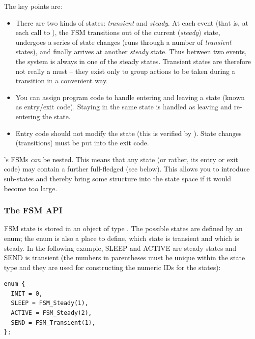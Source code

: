 The key points are:
\begin{itemize}
\item{There are two kinds of states:
    \textit{transient} and
    \textit{steady}. At each event (that is, at
    each call to ), the FSM transitions out of
    the current (\textit{steady}) state, undergoes a series of state
    changes (runs through a number of \textit{transient} states), and
    finally arrives at another \textit{steady} state. Thus between two
    events, the system is always in one of the steady states.
    Transient states are therefore not really a must -- they exist
    only to group actions to be taken during a transition in a
    convenient way.}
\item{You can assign program code to handle entering and leaving a state
    (known as entry/exit code).
    Staying in the same state is handled as leaving and re-entering
    the state.}
\item{Entry code should not modify the state (this is verified by
    {\opp}).  State changes (transitions) must be put into the exit
    code.}
\end{itemize}

{\opp}'s FSMs \textit{can} be nested. This means
that any state (or rather, its entry or exit code) may contain a
further full-fledged  (see below). This allows you
to introduce sub-states and thereby bring some structure into the
state space if it would become too large.


\subsubsection{The FSM API}


FSM state is stored in an object of type . The possible states
are defined by an enum; the enum is also a place to define, which
state is transient and which is steady. In the following example, SLEEP
and ACTIVE are steady states and SEND is transient (the numbers
in parentheses must be unique within the state type and they are used
for constructing the numeric IDs for the states):

\begin{verbatim}
enum {
  INIT = 0,
  SLEEP = FSM_Steady(1),
  ACTIVE = FSM_Steady(2),
  SEND = FSM_Transient(1),
};
\end{verbatim}



